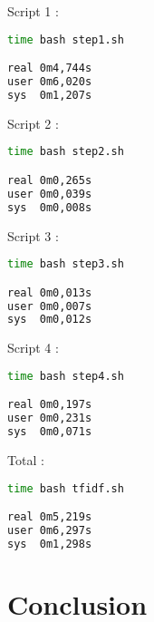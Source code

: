 \documentclass{article}
\begin{document}
Script 1 :

\begin{lstlisting}[language=bash,caption={Temps d'exécution du script 1}]
time bash step1.sh

real 0m4,744s
user 0m6,020s
sys  0m1,207s

\end{lstlisting}

Script 2 :

\begin{lstlisting}[language=bash,caption={Temps d'exécution du script 2}]
time bash step2.sh

real 0m0,265s
user 0m0,039s
sys  0m0,008s

\end{lstlisting}

Script 3 :

\begin{lstlisting}[language=bash,caption={Temps d'exécution du script 3}]
time bash step3.sh

real 0m0,013s
user 0m0,007s
sys  0m0,012s
\end{lstlisting}

Script 4 :

\begin{lstlisting}[language=bash,caption={Temps d'exécution du script 4}]
time bash step4.sh

real 0m0,197s
user 0m0,231s
sys  0m0,071s

\end{lstlisting}

Total :

\begin{lstlisting}[language=bash,caption={Temps d'exécution en tout}]
time bash tfidf.sh

real 0m5,219s
user 0m6,297s
sys  0m1,298s

\end{lstlisting}

\section{Conclusion}
\end{document}
